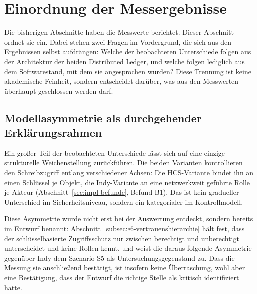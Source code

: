 \section{Einordnung der Messergebnisse}
\label{sec:results-einordnung}

Die bisherigen Abschnitte haben die Messwerte berichtet. Dieser Abschnitt ordnet sie ein. Dabei stehen zwei Fragen im Vordergrund, die sich aus den Ergebnissen selbst aufdrängen: Welche der beobachteten Unterschiede folgen aus der Architektur der beiden Distributed Ledger, und welche folgen lediglich aus dem Softwarestand, mit dem sie angesprochen wurden? Diese Trennung ist keine akademische Feinheit, sondern entscheidet darüber, was aus den Messwerten überhaupt geschlossen werden darf.

\subsection{Modellasymmetrie als durchgehender Erklärungsrahmen}
\label{sec:results-asymmetrie}

Ein großer Teil der beobachteten Unterschiede lässt sich auf eine einzige strukturelle Weichenstellung zurückführen. Die beiden Varianten kontrollieren den Schreibzugriff entlang verschiedener Achsen: Die HCS-Variante bindet ihn an einen Schlüssel je Objekt, die Indy-Variante an eine netzwerkweit geführte Rolle je Akteur (Abschnitt~\ref{sec:impl-befunde}, Befund B1). Das ist kein gradueller Unterschied im Sicherheitsniveau, sondern ein kategorialer im Kontrollmodell.

Diese Asymmetrie wurde nicht erst bei der Auswertung entdeckt, sondern bereits im Entwurf benannt: Abschnitt~\ref{subsec:e6-vertrauenshierarchie} hält fest, dass der schlüsselbasierte Zugriffsschutz nur zwischen berechtigt und unberechtigt unterscheidet und keine Rollen kennt, und weist die daraus folgende Asymmetrie gegenüber Indy dem Szenario S5 als Untersuchungsgegenstand zu. Dass die Messung sie anschließend bestätigt, ist insofern keine Überraschung, wohl aber eine Bestätigung, dass der Entwurf die richtige Stelle als kritisch identifiziert hatte.

